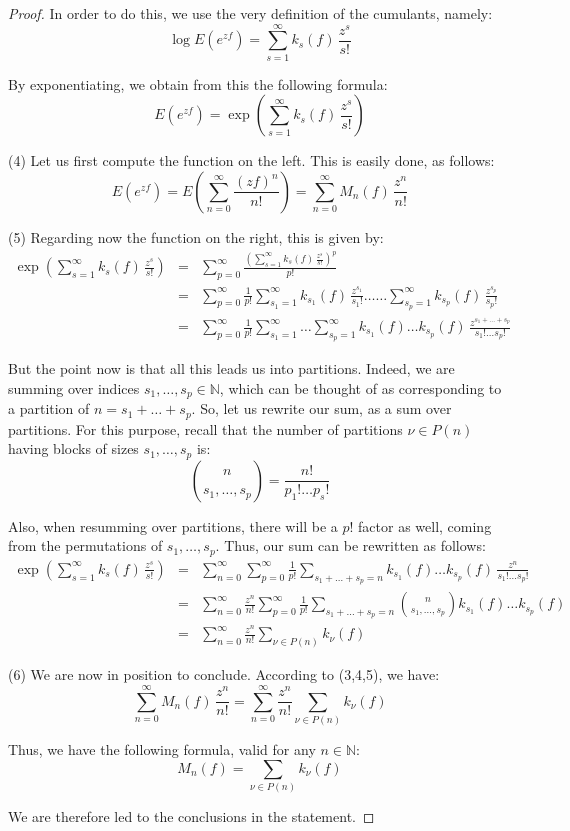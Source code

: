 \documentclass[12pt]{amsbook}
\begin{document}
\begin{proof}
In order to do this, we use the very definition of the cumulants, namely:
$$\log E(e^{zf})=\sum_{s=1}^\infty k_s(f)\,\frac{z^s}{s!}$$

By exponentiating, we obtain from this the following formula:
$$E(e^{zf})=\exp\left(\sum_{s=1}^\infty k_s(f)\,\frac{z^s}{s!}\right)$$

(4) Let us first compute the function on the left. This is easily done, as follows:
$$E(e^{zf})
=E\left(\sum_{n=0}^\infty\frac{(zf)^n}{n!}\right)
=\sum_{n=0}^\infty M_n(f)\,\frac{z^n}{n!}$$

(5) Regarding now the function on the right, this is given by:
\begin{eqnarray*}
\exp\left(\sum_{s=1}^\infty k_s(f)\,\frac{z^s}{s!}\right)
&=&\sum_{p=0}^\infty\frac{\left(\sum_{s=1}^\infty k_s(f)\,\frac{z^s}{s!}\right)^p}{p!}\\
&=&\sum_{p=0}^\infty\frac{1}{p!}\sum_{s_1=1}^\infty k_{s_1}(f)\,\frac{z^{s_1}}{s_1!}\ldots\ldots\sum_{s_p=1}^\infty k_{s_p}(f)\,\frac{z^{s_p}}{s_p!}\\
&=&\sum_{p=0}^\infty\frac{1}{p!}\sum_{s_1=1}^\infty\ldots\sum_{s_p=1}^\infty k_{s_1}(f)\ldots k_{s_p}(f)\,\frac{z^{s_1+\ldots+s_p}}{s_1!\ldots s_p!}
\end{eqnarray*}

But the point now is that all this leads us into partitions. Indeed, we are summing over indices $s_1,\ldots,s_p\in\mathbb N$, which can be thought of as corresponding to a partition of $n=s_1+\ldots+s_p$. So, let us rewrite our sum, as a sum over partitions. For this purpose, recall that the number of partitions $\nu\in P(n)$ having blocks of sizes $s_1,\ldots,s_p$ is:
$$\binom{n}{s_1,\ldots,s_p}=\frac{n!}{p_1!\ldots p_s!}$$

Also, when resumming over partitions, there will be a $p!$ factor as well, coming from the permutations of $s_1,\ldots,s_p$. Thus, our sum can be rewritten as follows:
\begin{eqnarray*}
\exp\left(\sum_{s=1}^\infty k_s(f)\,\frac{z^s}{s!}\right)
&=&\sum_{n=0}^\infty\sum_{p=0}^\infty\frac{1}{p!}\sum_{s_1+\ldots+s_p=n}k_{s_1}(f)\ldots k_{s_p}(f)\,\frac{z^n}{s_1!\ldots s_p!}\\
&=&\sum_{n=0}^\infty\frac{z^n}{n!}\sum_{p=0}^\infty\frac{1}{p!}\sum_{s_1+\ldots+s_p=n}\binom{n}{s_1,\ldots,s_p}k_{s_1}(f)\ldots k_{s_p}(f)\\
&=&\sum_{n=0}^\infty\frac{z^n}{n!}\sum_{\nu\in P(n)}k_\nu(f)
\end{eqnarray*}

(6) We are now in position to conclude. According to (3,4,5), we have:
$$\sum_{n=0}^\infty M_n(f)\,\frac{z^n}{n!}=\sum_{n=0}^\infty\frac{z^n}{n!}\sum_{\nu\in P(n)}k_\nu(f)$$

Thus, we have the following formula, valid for any $n\in\mathbb N$:
$$M_n(f)=\sum_{\nu\in P(n)}k_\nu(f)$$

We are therefore led to the conclusions in the statement.
\end{proof}
\end{document}
